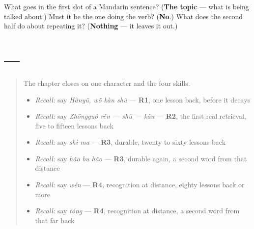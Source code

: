 \begin{tcolorbox}[breakable,colback=teal!4,colframe=teal!35!black,title={Before you move on}]
What goes in the first slot of a Mandarin sentence? (\textbf{The topic} — what is being talked about.) Must it be the one doing the verb? (\textbf{No}.) What does the second half do about repeating it? (\textbf{Nothing} — it leaves it out.)
\end{tcolorbox}
\section[Practice]{ — }

\label{lesson:ZH-C23-practice}



\begin{quote}
The chapter closes on one character and the four skills.

\begin{itemize}
\raggedright
  \item \emph{Recall:} say \emph{Hànyǔ, wǒ kàn shū} — \textbf{R1}, one lesson back, before it decays
  \item \emph{Recall:} say \emph{Zhōngguó rén — shū — kàn} — \textbf{R2}, the first real retrieval, five to fifteen lessons back
  \item \emph{Recall:} say \emph{shì ma} — \textbf{R3}, durable, twenty to sixty lessons back
  \item \emph{Recall:} say \emph{hǎo bu hǎo} — \textbf{R3}, durable again, a second word from that distance
  \item \emph{Recall:} say \emph{wén} — \textbf{R4}, recognition at distance, eighty lessons back or more
  \item \emph{Recall:} say \emph{tóng} — \textbf{R4}, recognition at distance, a second word from that far back
\end{itemize}
\end{quote}


